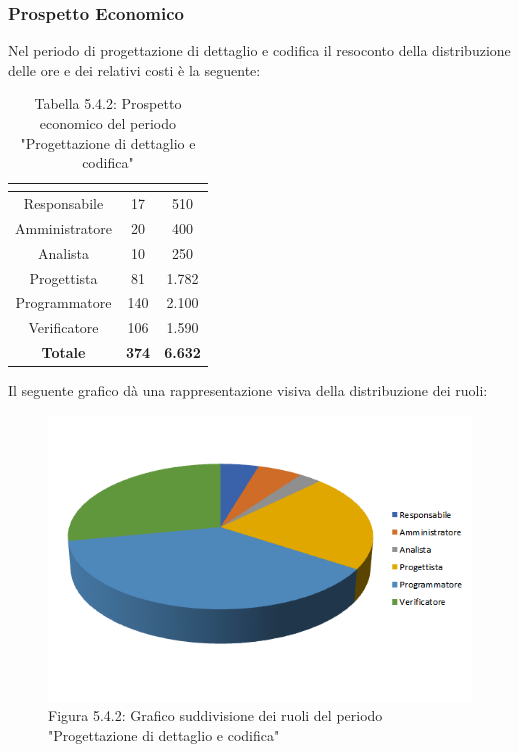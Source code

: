 \subsubsection{Prospetto Economico}
Nel periodo di progettazione di dettaglio e codifica il resoconto della distribuzione delle ore e dei relativi costi è la seguente:

\renewcommand{\arraystretch}{1.5}
\begin{table}[H]
\begin{center}
\begin{tabular}{|c|c|c|}
\hline
\rowcolor{title_row}
\textbf{\color{title_text}{Ruolo}}  & \textbf{\color{title_text}{Ore}} & \textbf{\color{title_text}{Costo in \euro}} \\ \hline
Responsabile    & 17           & 510                 \\ \hline
Amministratore  & 20           & 400                 \\ \hline
Analista        & 10           & 250  	               \\ \hline
Progettista     & 81           & 1.782                \\ \hline
Programmatore   & 140          & 2.100                \\ \hline
Verificatore    & 106          & 1.590                \\ \hline
\textbf{Totale} & \textbf{374}    & \textbf{6.632}           \\ \hline
\end{tabular}
\caption{Tabella 5.4.2: Prospetto economico del periodo "Progettazione di dettaglio e codifica"\label{}}
\end{center}
\end{table}
\renewcommand{\arraystretch}{1}

Il seguente grafico dà una rappresentazione visiva della distribuzione dei ruoli: \\
\begin{figure} [H]
	\centering
	\includegraphics[scale=1]{Res/ExcelGrafici/Grafici/CodificaRuoli.png}
	\caption{Figura 5.4.2: Grafico suddivisione dei ruoli del periodo "Progettazione di dettaglio e codifica"}\label{}
\end{figure}

\pagebreak

